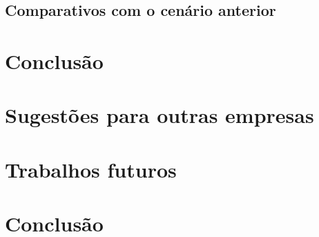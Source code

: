 \documentclass[
	12pt,				%
	openright,			%
	twoside,			%
	a4paper,			%
	english,			%
	french,				%
	spanish,			%
	brazil,				%
	]{abntex2}
\begin{document}
\section{Comparativos com o cenário anterior}

\chapter{Conclusão}

\chapter{Sugestões para outras empresas}

\chapter{Trabalhos futuros}

\lipsum[1]

\lipsum[2-3]


\chapter{Conclusão}

\lipsum[31-33]

\postextual




%
%

\end{document}
